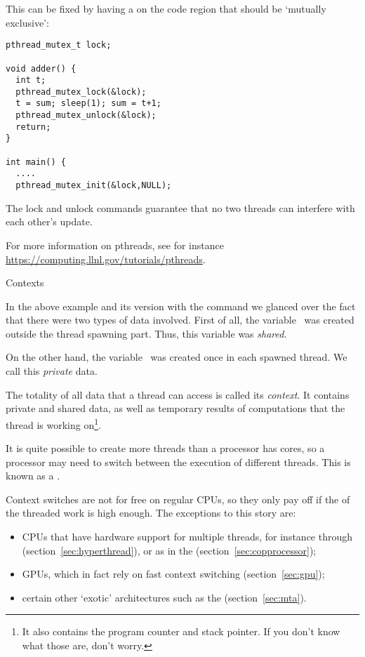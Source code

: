 This can be fixed by having a  on the code region that should be
`mutually exclusive':
\begin{verbatim}
pthread_mutex_t lock;

void adder() {
  int t;
  pthread_mutex_lock(&lock);
  t = sum; sleep(1); sum = t+1; 
  pthread_mutex_unlock(&lock);
  return;
}

int main() {
  ....
  pthread_mutex_init(&lock,NULL);

\end{verbatim}
The lock and unlock commands guarantee that no two threads can
interfere with each other's update.

For more information on pthreads, see for instance
\url{https://computing.llnl.gov/tutorials/pthreads}.


 {Contexts}
\label{sec:context}

In the above example and its version with the  command
we glanced over the fact that there were two types of data involved.
First of all, the variable~ was created outside the thread spawning
part. Thus, this variable was \emph{shared}.

On the other hand, the variable~ was created once in each spawned thread.
We call this \emph{private} data.

The totality of all data that a thread can access is called
its \emph{context}.  It contains private and shared data, as well as
temporary results of computations that the thread is working
on\footnote{It also contains the program counter and stack pointer. If
you don't know what those are, don't worry.}.

It is quite possible to create more threads than a processor has cores,
so a processor may need to switch between the execution of different threads.
This is known as a .

Context switches are not for free on regular CPUs, so they only pay off
if the  of the threaded work is high enough.
The exceptions to this story are:
\begin{itemize}
\item CPUs that have hardware support for multiple threads, for
  instance through 
  (section~\ref{sec:hyperthread}), or as in the
   (section~\ref{sec:copprocessor});
\item \acp{GPU}, which in fact rely on fast context switching (section~\ref{sec:gpu});
\item certain other `exotic' architectures such as the 
  (section~\ref{sec:mta}).
\end{itemize}

